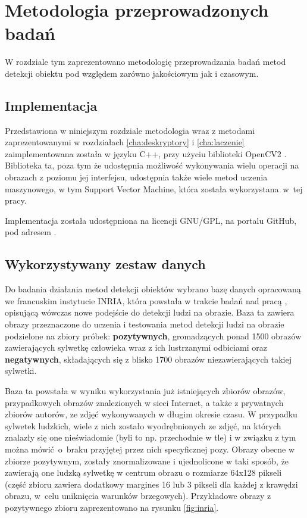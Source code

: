 \chapter{Metodologia przeprowadzonych badań}
\label{cha:metodologia}

W rozdziale tym zaprezentowano metodologię przeprowadzania badań metod detekcji obiektu pod względem zarówno jakościowym jak i czasowym.

\section{Implementacja}
\label{sec:implementacja}

Przedstawiona w niniejszym rozdziale metodologia wraz z metodami zaprezentowanymi w rozdziałach \ref{cha:deskryptory} i \ref{cha:laczenie} zaimplementowana została w języku C++, przy użyciu biblioteki OpenCV2 \cite{opencv_library}. Biblioteka ta, poza tym że udostępnia możliwość wykonywania wielu operacji na obrazach z poziomu jej interfejsu, udostępnia także wiele metod uczenia maszynowego, w tym Support Vector Machine, która została wykorzystana~w~tej pracy.

Implementacja została udostępniona na licencji GNU/GPL, na portalu GitHub, pod adresem \cite{GitHub_Sauce}.

\section{Wykorzystywany zestaw danych}
\label{sec:dane}
Do badania działania metod detekcji obiektów wybrano bazę danych opracowaną we francuskim instytucie INRIA, która powstała w trakcie badań nad pracą \cite{Dalal05}, opisującą wówczas nowe podejście do detekcji ludzi na obrazie.
Baza ta zawiera obrazy przeznaczone do uczenia i testowania metod detekcji ludzi na obrazie podzielone na zbiory próbek: \textbf{pozytywnych}, gromadzących ponad 1500 obrazów zawierających sylwetkę człowieka wraz z ich lustrzanymi odbiciami oraz \textbf{negatywnych}, składających się z blisko 1700 obrazów niezawierających takiej sylwetki.

Baza ta powstała w wyniku wykorzystania już istniejących zbiorów obrazów, przypadkowych obrazów znalezionych w sieci Internet, a także z prywatnych zbiorów autorów, ze zdjęć wykonywanych w długim okresie czasu.
W przypadku sylwetek ludzkich, wiele z nich zostało wyodrębnionych ze zdjęć, na których znalazły się one nieświadomie (byli to np. przechodnie w tle) i w związku z tym można mówić~o~braku przyjętej przez nich specyficznej pozy.
Obrazy obecne w zbiorze pozytywnym, zostały znormalizowane i ujednolicone w taki sposób, że zawierają one ludzką sylwetkę w centrum obrazu o rozmiarze 64x128 pikseli (część zbioru zawiera dodatkowy margines 16 lub 3 pikseli dla każdej z krawędzi obrazu, w~celu uniknięcia warunków brzegowych). Przykładowe obrazy z pozytywnego zbioru zaprezentowano na rysunku \ref{fig:inria}.

